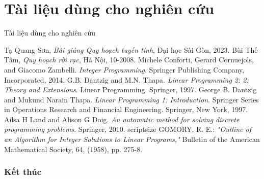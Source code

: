 \documentclass{beamer}
\begin{document}
\section{Tài liệu dùng cho nghiên cứu}
\begin{frame}[allowframebreaks]{Tài liệu dùng cho nghiên cứu}
    \scriptsize
    \begin{thebibliography}{}
         Tạ Quang Sơn, \textit{Bài giảng Quy hoạch tuyến tính}, Đại học Sài Gòn, 2023.
         Bùi Thế Tâm, \textit{Quy hoạch rời rạc}, Hà Nội, 10-2008.
         Michele Conforti, Gerard Cornuejols, and Giacomo Zambelli. \textit{Integer Programming}. Springer Publishing Company, Incorporated, 2014.
         G.B. Dantzig and M.N. Thapa. \textit{Linear Programming 2: 2: Theory and Extensions}. Linear Programming. Springer, 1997.
         George B. Dantzig and Mukund Narain Thapa. \textit{Linear Programming 1: Introduction}. Springer Series in Operations Research and Financial Engineering. Springer, New York, 1997.
         Ailsa H Land and Alison G Doig. \textit{An automatic method for solving discrete programming problems}. Springer, 2010.
        scriptsize
         GOMORY, R. E.: \textit{"Outline of an Algorithm for Integer Solutions to Linear Programs,"} Bulletin of the American Mathematical Society, 64, (1958), pp. 275-8.
    \end{thebibliography}
\end{frame}

\begin{frame}\frametitle{Kết thúc}
    \begin{block}{}
    \medskip
    \center{\huge \it \textcolor[rgb]{0.50,0.30,1.0}{Cảm ơn quý thầy cô và các anh chị đã quan tâm theo dõi!}}
    \medskip
    \end{block}	
\end{frame}    
\end{document}
